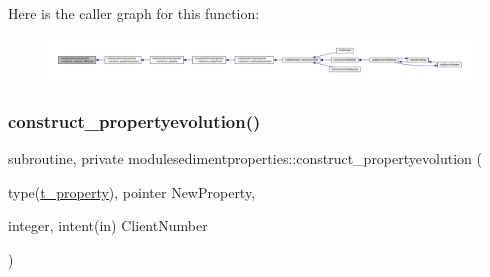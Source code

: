 Here is the caller graph for this function\+:\nopagebreak
\begin{figure}[H]
\begin{center}
\leavevmode
\includegraphics[width=350pt]{namespacemodulesedimentproperties_ad39d979b59e5b787373491b93c07fbf0_icgraph}
\end{center}
\end{figure}
\mbox{\label{namespacemodulesedimentproperties_a0062c792fb1ce4d0c7dbe3c701104971}} 
\subsubsection{\texorpdfstring{construct\+\_\+propertyevolution()}{construct\_propertyevolution()}}
{\footnotesize\ttfamily subroutine, private modulesedimentproperties\+::construct\+\_\+propertyevolution (\begin{DoxyParamCaption}\item[{type(\mbox{\hyperlink{structmodulesedimentproperties_1_1t__property}{t\+\_\+property}}), pointer}]{New\+Property,  }\item[{integer, intent(in)}]{Client\+Number }\end{DoxyParamCaption})\hspace{0.3cm}{\ttfamily [private]}}

